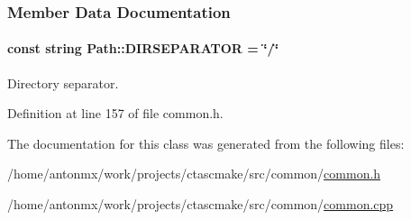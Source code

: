 \subsubsection{Member Data Documentation}
\hypertarget{classPath_aa881be005b73647137228e3db0dacdb6}{
\paragraph[{DIRSEPARATOR}]{\setlength{\rightskip}{0pt plus 5cm}const string {\bf Path::DIRSEPARATOR} = \char`\"{}/\char`\"{}}\hfill}
\label{classPath_aa881be005b73647137228e3db0dacdb6}


Directory separator. 



Definition at line 157 of file common.h.



The documentation for this class was generated from the following files:\begin{DoxyCompactItemize}
\item 
/home/antonmx/work/projects/ctascmake/src/common/\hyperlink{common_8h}{common.h}\item 
/home/antonmx/work/projects/ctascmake/src/common/\hyperlink{common_8cpp}{common.cpp}\end{DoxyCompactItemize}
